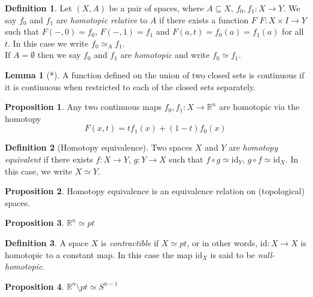 \documentclass[a4paper,14pt]{extarticle}
\theoremstyle{definition}
\newtheorem*{definition}{Definition}
\newtheorem*{lemma}{Lemma}
\newtheorem*{proposition}{Proposition}
\begin{document}
\begin{definition}
  Let $(X,A)$ be a pair of spaces, where $A\subseteq X$, $f_0,f_1:X\rightarrow Y$. We say
  $f_0$ and $f_1$ are \emph{homotopic relative} to $A$ if there exists a function $F$ 
  $F:X\times I\rightarrow Y$ such that $F(-,0)=f_0, \,F(-,1)=f_1$ and $F(a,t)=f_0(a)=f_1(a)$ 
  for all $t$. In this case we write $f_0\simeq_A f_1$. \\

  If $A=\emptyset$ then we say $f_0$ and $f_1$ are \emph{homotopic} and write $f_0\simeq f_1$.
\end{definition}

\begin{lemma}[*]
  A function defined on the union of two closed sets is continuous if it is continuous when 
  restricted to each of the closed sets separately.
\end{lemma}

\begin{proposition}
  Any two continuous maps $f_0,f_1:X\rightarrow \mathbb{R}^n$ are homotopic via the homotopy
  \[F(x,t)=tf_1(x)+(1-t)f_0(x)\]
\end{proposition}

\begin{definition}[Homotopy equivalence]
  Two spaces $X$ and $Y$ are \emph{homotopy equivalent} if there exists 
  $f:X\rightarrow Y$, $g:Y\rightarrow X$ such that 
  $f\circ g\simeq\text{id}_Y$, $g\circ f\simeq\text{id}_X$. In this case, we write 
  $X\simeq Y$.
\end{definition}

\begin{proposition}
  Homotopy equivalence is an equivalence relation on (topological) spaces.
\end{proposition}

\begin{proposition}
  $\mathbb{R}^n\simeq pt$
\end{proposition}

\begin{definition}
  A space $X$ is \emph{contractible} if $X\simeq pt$, or in other words,
  $\text{id}:X\rightarrow X$ is homotopic to 
  a constant map. In this case the map $\text{id}_X$ is said to be \emph{null-homotopic}.
\end{definition}

\begin{proposition}
  $\mathbb{R}^n\setminus pt\simeq S^{n-1}$
\end{proposition}
\end{document}
